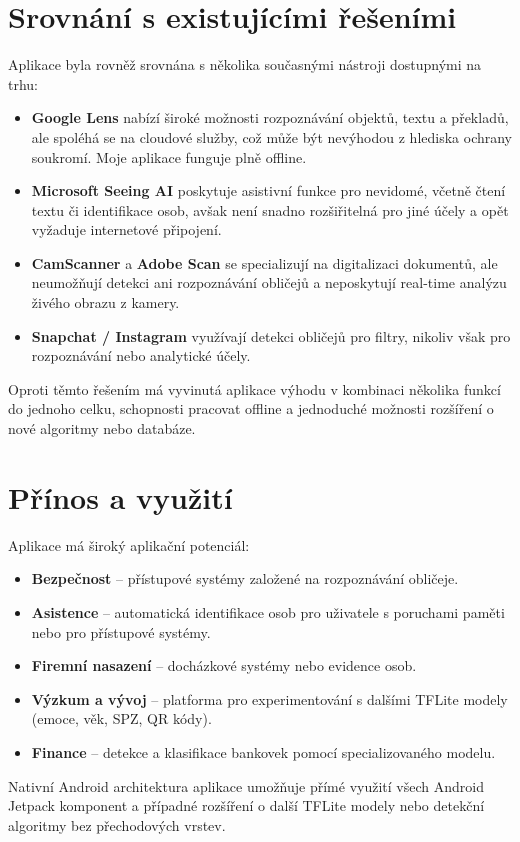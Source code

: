 \documentclass[FM,BP,CZ]{tulthesis}
\begin{document}
\section{Srovnání s existujícími řešeními}
Aplikace byla rovněž srovnána s několika současnými nástroji dostupnými na trhu:
\begin{itemize}
    \item \textbf{Google Lens} nabízí široké možnosti rozpoznávání objektů, textu a překladů, ale spoléhá se na cloudové služby, což může být nevýhodou z hlediska ochrany soukromí. Moje aplikace funguje plně offline.
    \item \textbf{Microsoft Seeing AI} poskytuje asistivní funkce pro nevidomé, včetně čtení textu či identifikace osob, avšak není snadno rozšiřitelná pro jiné účely a opět vyžaduje internetové připojení.
    \item \textbf{CamScanner} a \textbf{Adobe Scan} se specializují na digitalizaci dokumentů, ale neumožňují detekci ani rozpoznávání obličejů a neposkytují real-time analýzu živého obrazu z kamery.
    \item \textbf{Snapchat / Instagram} využívají detekci obličejů pro filtry, nikoliv však pro rozpoznávání nebo analytické účely.
\end{itemize}
Oproti těmto řešením má vyvinutá aplikace výhodu v kombinaci několika funkcí do jednoho celku, schopnosti pracovat offline a jednoduché možnosti rozšíření o nové algoritmy nebo databáze.
\section{Přínos a využití}
Aplikace má široký aplikační potenciál:
\begin{itemize}
    \item \textbf{Bezpečnost} – přístupové systémy založené na rozpoznávání obličeje.
    \item \textbf{Asistence} – automatická identifikace osob pro uživatele s poruchami paměti nebo pro přístupové systémy.
    \item \textbf{Firemní nasazení} – docházkové systémy nebo evidence osob.
    \item \textbf{Výzkum a vývoj} – platforma pro experimentování s dalšími TFLite modely (emoce, věk, SPZ, QR kódy).
    \item \textbf{Finance} – detekce a klasifikace bankovek pomocí specializovaného modelu.
\end{itemize}
Nativní Android architektura aplikace umožňuje přímé využití všech Android Jetpack komponent a případné rozšíření o další TFLite modely nebo detekční algoritmy bez přechodových vrstev.
\end{document}
